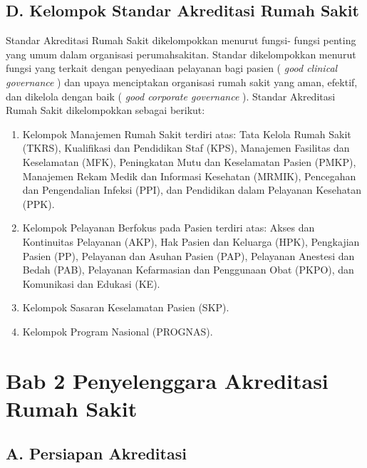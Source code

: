 \documentclass[
]{book}
\providecommand{\tightlist}{%
  \setlength{\itemsep}{0pt}\setlength{\parskip}{0pt}}
\begin{document}
\hypertarget{d.-kelompok-standar-akreditasi-rumah-sakit}{%
\section*{D. Kelompok Standar Akreditasi Rumah Sakit}\label{d.-kelompok-standar-akreditasi-rumah-sakit}}

Standar Akreditasi Rumah Sakit dikelompokkan menurut fungsi- fungsi penting yang umum dalam organisasi perumahsakitan. Standar dikelompokkan menurut fungsi yang terkait dengan penyediaan pelayanan bagi pasien ( \emph{good clinical governance} ) dan upaya menciptakan organisasi rumah sakit yang aman, efektif, dan dikelola dengan baik ( \emph{good corporate governance} ). Standar Akreditasi Rumah Sakit dikelompokkan sebagai berikut:

\begin{enumerate}
\def\labelenumi{\arabic{enumi}.}
\tightlist
\item
  Kelompok Manajemen Rumah Sakit terdiri atas: Tata Kelola Rumah Sakit (TKRS), Kualifikasi dan Pendidikan Staf (KPS), Manajemen Fasilitas dan Keselamatan (MFK), Peningkatan Mutu dan Keselamatan Pasien (PMKP), Manajemen Rekam Medik dan Informasi Kesehatan (MRMIK), Pencegahan dan Pengendalian Infeksi (PPI), dan Pendidikan dalam Pelayanan Kesehatan (PPK).
\item
  Kelompok Pelayanan Berfokus pada Pasien terdiri atas: Akses dan Kontinuitas Pelayanan (AKP), Hak Pasien dan Keluarga (HPK), Pengkajian Pasien (PP), Pelayanan dan Asuhan Pasien (PAP), Pelayanan Anestesi dan Bedah (PAB), Pelayanan Kefarmasian dan Penggunaan Obat (PKPO), dan Komunikasi dan Edukasi (KE).
\item
  Kelompok Sasaran Keselamatan Pasien (SKP).
\item
  Kelompok Program Nasional (PROGNAS).
\end{enumerate}

\hypertarget{bab-2-penyelenggara-akreditasi-rumah-sakit}{%
\chapter*{Bab 2 Penyelenggara Akreditasi Rumah Sakit}\label{bab-2-penyelenggara-akreditasi-rumah-sakit}}

\hypertarget{a.-persiapan-akreditasi}{%
\section*{A. Persiapan Akreditasi}\label{a.-persiapan-akreditasi}}
\end{document}
